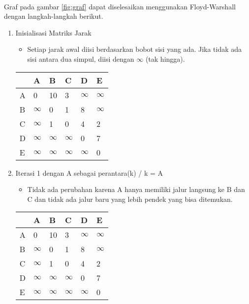\\
Graf pada gambar \ref{fig:graf} dapat diselesaikan menggunakan Floyd-Warshall dengan langkah-langkah berikut.
\begin{enumerate}
    \item Inisialisasi Matriks Jarak
    \begin{itemize}
        \item Setiap jarak awal diisi berdasarkan bobot sisi yang ada. Jika tidak ada sisi antara dua simpul, diisi dengan $\infty$ (tak hingga).
    \end{itemize}
    \begin{table}[H]
        \begin{tabular}{|l|l|l|l|l|l|}
        \hline
          & A        & B        & C        & D        & E        \\ \hline
        A & 0        & 10       & 3        & $\infty$ & $\infty$ \\ \hline
        B & $\infty$ & 0        & 1        & 8        & $\infty$ \\ \hline
        C & $\infty$ & 1        & 0        & 4        & 2        \\ \hline
        D & $\infty$ & $\infty$ & $\infty$ & 0        & 7        \\ \hline
        E & $\infty$ & $\infty$ & $\infty$ & $\infty$ & 0        \\ \hline
        \end{tabular}
    \end{table}

    \item Iterasi 1 dengan A sebagai perantara(k) / k = A
    \begin{itemize}
        \item Tidak ada perubahan karena A hanya memiliki jalur langsung ke B dan C dan tidak ada jalur baru yang lebih pendek yang bisa ditemukan.
    \end{itemize}
    \begin{table}[H]
        \begin{tabular}{|l|l|l|l|l|l|}
        \hline
          & A        & B        & C        & D        & E        \\ \hline
        A & 0        & 10       & 3        & $\infty$ & $\infty$ \\ \hline
        B & $\infty$ & 0        & 1        & 8        & $\infty$ \\ \hline
        C & $\infty$ & 1        & 0        & 4        & 2        \\ \hline
        D & $\infty$ & $\infty$ & $\infty$ & 0        & 7        \\ \hline
        E & $\infty$ & $\infty$ & $\infty$ & $\infty$ & 0        \\ \hline
        \end{tabular}
    \end{table}


\end{enumerate}
